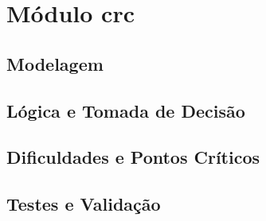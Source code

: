 ﻿%
\section{Módulo crc}
\subsection{Modelagem}
\subsection{Lógica e Tomada de Decisão}
\subsection{Dificuldades e Pontos Críticos}
\subsection{Testes e Validação}

